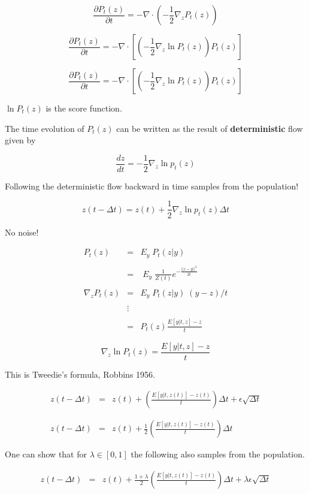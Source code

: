 {\vfill
$$\frac{\partial P_t(z)}{\partial t} = - \nabla \cdot\left(-\frac{1}{2}\nabla_z P_t(z)\right)$$

\vfill
$$\frac{\partial P_t(z)}{\partial t} = - \nabla \cdot\left[\left(-\frac{1}{2}\nabla_z \ln P_t(z)\right)P_t(z)\right]$$


$$\frac{\partial P_t(z)}{\partial t} = - \nabla \cdot\left[\left(-\frac{1}{2}\nabla_z \ln P_t(z)\right)P_t(z)\right]$$

\vfill
$\ln P_t(z)$ is the score function.

\vfill
The time evolution of $P_t(z)$ can be written as the result of {\bf deterministic} flow given by

$$\frac{dz}{dt} = - \frac{1}{2}\nabla_z \ln p_t(z)$$


Following the deterministic flow backward in time samples from the population!

$$z(t-\Delta t) = z(t) + \frac{1}{2} \nabla_z \ln p_t(z) \Delta t$$

\vfill
No noise!


{\Large
\begin{eqnarray*}
  P_t(z) & = & E_y \;P_t(z|y) \\
  \\
  & = & \;E_y\;\frac{1}{Z(t)} e^{-\frac{||z-y||^2}{2t}} \\
  \\
  \nabla_z P_t(z) & = & E_y \;P_t(z|y)\; (y-z)/t \\
  \\
 & \vdots & \\
  \\
  & = & P_t(z)\frac{E[y|t,z]-z}{t}
  \end{eqnarray*}
}

 {\color{red}
 $$\nabla_z \ln P_t(z)  = \frac{E[y|t,z]-z}{t}$$
 }

This is Tweedie's formula, Robbins 1956.


\begin{eqnarray*}
z(t - \Delta t) & = & z(t) + \left(\frac{E[y|t,z(t)] - z(t)}{t}\right)\Delta t + \epsilon\sqrt{\Delta t} \\
\\
\\
z(t -\Delta t) & = & z(t) + \frac{1}{2}\left(\frac{E[y|t,z(t)] - z(t)}{t}\right)\Delta t
\end{eqnarray*}

One can show that for $\lambda \in [0,1]$ the following also samples from the population.

\begin{eqnarray*}
z(t -\Delta t) & = & z(t) + \frac{1+\lambda}{2}\left(\frac{E[y|t,z(t)] - z(t)}{t}\right)\Delta t + \lambda \epsilon\sqrt{\Delta t}
\end{eqnarray*}

}


